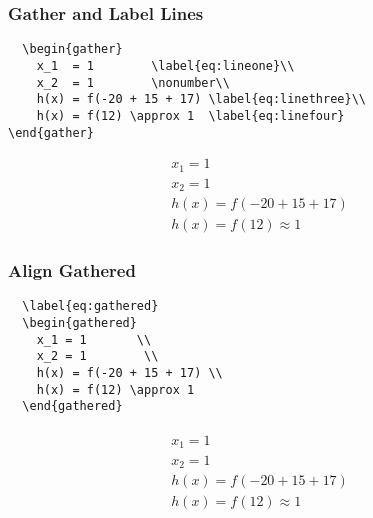 \documentclass[12pt,english]{article}
\begin{document}
\subsubsection{Gather and Label Lines}
\begin{verbatim}
  \begin{gather}
    x_1  = 1        \label{eq:lineone}\\
    x_2  = 1        \nonumber\\
    h(x) = f(-20 + 15 + 17) \label{eq:linethree}\\
    h(x) = f(12) \approx 1  \label{eq:linefour}
\end{gather}
\end{verbatim}
\begin{gather}
  x_1  = 1        \label{eq:lineone}\\
  x_2  = 1        \nonumber\\
  h(x) = f(-20 + 15 + 17) \label{eq:linethree}\\
  h(x) = f(12) \approx 1  \label{eq:linefour}
\end{gather}
\subsubsection{Align Gathered}
\begin{verbatim}
  \label{eq:gathered}
  \begin{gathered}
    x_1 = 1       \\
    x_2 = 1        \\
    h(x) = f(-20 + 15 + 17) \\
    h(x) = f(12) \approx 1
  \end{gathered}
\end{verbatim}
\begin{align}
  \label{eq:gathered}
  \begin{gathered}
    x_1 = 1       \\
    x_2 = 1        \\
    h(x) = f(-20 + 15 + 17) \\
    h(x) = f(12) \approx 1
  \end{gathered}
\end{align}

\pagebreak
\end{document}
